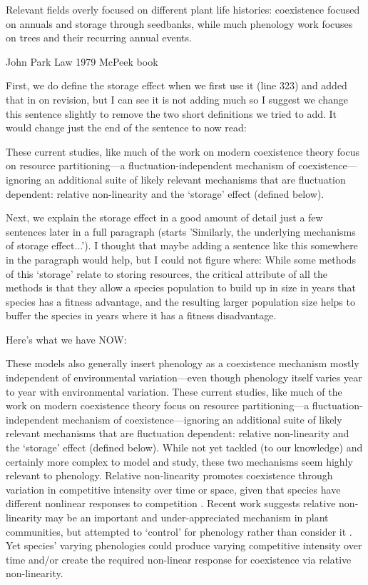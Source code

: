 Relevant fields overly focused on different plant life histories: coexistence focused on annuals and storage through seedbanks, while much phenology work focuses on trees and their recurring annual events. 

John Park
Law 1979
McPeek book


First, we do define the storage effect when we first use it (line 323) and added that in on revision, but I can see it is not adding much so I suggest we change this sentence slightly to remove the two short definitions we tried to add. It would change just the end of the sentence to now read:

These current studies, like much of the work on modern coexistence theory focus on resource partitioning---a fluctuation-independent mechanism of coexistence---ignoring an additional suite of likely relevant mechanisms that are fluctuation dependent: relative non-linearity and the `storage' effect (defined below).

Next, we explain the storage effect in a good amount of detail just a few sentences later in a full paragraph (starts 'Similarly, the underlying mechanisms of storage effect...'). I thought that maybe adding a sentence like this somewhere in the paragraph would help, but I could not figure where:
While some methods of this `storage' relate to storing  resources, the critical attribute of all the methods is that they allow a species population to build up in size in years that species has a fitness advantage, and the resulting larger population size helps to buffer the species in years where it has a fitness disadvantage.

Here's what we have NOW:

These models also generally insert phenology as a coexistence mechanism mostly independent of environmental variation---even though phenology itself varies year to year with environmental variation. These current studies, like much of the work on modern coexistence theory focus on resource partitioning---a fluctuation-independent mechanism of coexistence---ignoring an additional suite of likely relevant mechanisms that are fluctuation dependent: relative non-linearity and the `storage' effect (defined below). While not yet tackled (to our knowledge) and certainly more complex to model and study, these two mechanisms seem highly relevant to phenology. Relative non-linearity promotes coexistence through variation in competitive intensity over time or space, given that species have different nonlinear responses to competition \citep{CHESSON:1994vn,Chesson:2000vd}. Recent work suggests relative non-linearity may be an important and under-appreciated mechanism in plant communities, but attempted to `control' for phenology rather than consider it \citep{hallett2019rainfall}. Yet species' varying phenologies could produce varying competitive intensity over time and/or create the required non-linear response for coexistence via relative non-linearity. 

